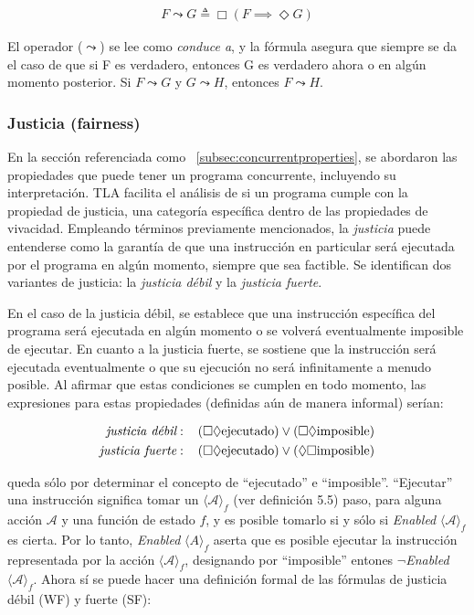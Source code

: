 \begin{align}
F \leadsto G \triangleq \Box(F \implies \Diamond G)
\end{align}

El operador ($\leadsto$) se lee como \textit{conduce a}, y la fórmula asegura que siempre se da el caso de que si F es verdadero, entonces G es verdadero ahora o en algún momento posterior. Si $F \leadsto G$ y $G \leadsto H$, entonces $F \leadsto H$.

\subsubsection{Justicia (fairness)}
En la sección referenciada como ~\ref{subsec:concurrentproperties}, se abordaron las propiedades que puede tener un programa concurrente, incluyendo su interpretación. TLA facilita el análisis de si un programa cumple con la propiedad de justicia, una categoría específica dentro de las propiedades de vivacidad. Empleando términos previamente mencionados, la \textit{justicia} puede entenderse como la garantía de que una instrucción en particular será ejecutada por el programa en algún momento, siempre que sea factible. Se identifican dos variantes de justicia: la \textit{justicia débil} y la \textit{justicia fuerte}.

En el caso de la justicia débil, se establece que una instrucción específica del programa será ejecutada en algún momento o se volverá eventualmente imposible de ejecutar. En cuanto a la justicia fuerte, se sostiene que la instrucción será ejecutada eventualmente o que su ejecución no será infinitamente a menudo posible. Al afirmar que estas condiciones se cumplen en todo momento, las expresiones para estas propiedades (definidas aún de manera informal) serían:

\begin{align*}
\textit{justicia débil}: \hspace{0.3cm} (\Box\Diamond \text{ejecutado}) \lor (\Box\Diamond \text{imposible}) \\
\textit{justicia fuerte}: \hspace{0.3cm} (\Box\Diamond \text{ejecutado}) \lor (\Diamond\Box \text{imposible}) \\
\end{align*}

queda sólo por determinar el concepto de ``ejecutado'' e ``imposible''. ``Ejecutar'' una instrucción significa tomar un $\langle \mathcal{A}\rangle_f$ (ver definición 5.5) paso, para alguna acción $\mathcal{A}$ y una función de estado $f$, y es posible tomarlo  si y sólo si \textit{Enabled} $\langle \mathcal{A}\rangle_f$ es cierta. Por lo tanto, \textit{Enabled} $\langle A \rangle_f$ aserta que es posible ejecutar la instrucción representada por la acción $\langle \mathcal{A}\rangle_f$, designando por ``imposible'' entones $\neg$\textit{Enabled} $\langle \mathcal{A}\rangle_f$. Ahora sí se puede hacer una definición formal de las fórmulas de justicia débil (WF) y fuerte (SF):

